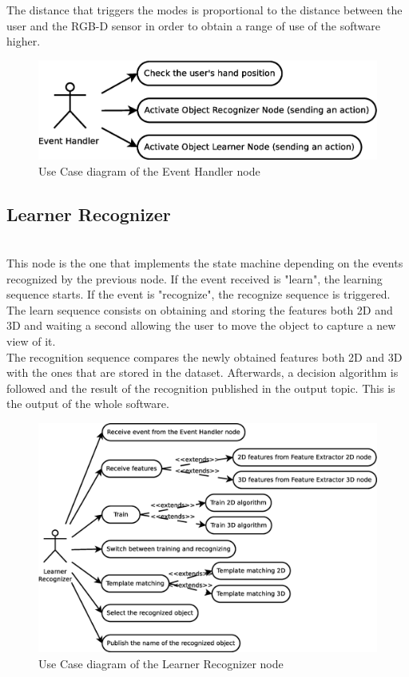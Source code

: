 	The distance that triggers the modes is proportional to the distance between the user and the RGB-D sensor in order to obtain a range of use of the software higher. 
	\begin{figure}[h]
		\begin{center}
			\includegraphics[scale=0.2]{img/diagrams/uc_event_handler.eps}
			\caption[Use case diagram Event Handler node]{Use Case diagram of the Event Handler node}
		\end{center}
	\end{figure}

\subsection{Learner Recognizer}\\

	This node is the one that implements the state machine depending on the events recognized by the previous node. If the event received is "learn", the learning sequence starts. If the event is "recognize", the recognize sequence is triggered. 
	\\

	The learn sequence consists on obtaining and storing the features both 2D and 3D and waiting a second allowing the user to move the object to capture a new view of it. 
	\\

	The recognition sequence compares the newly obtained features both 2D and 3D with the ones that are stored in the dataset. Afterwards, a decision algorithm is followed and the result of the recognition published in the output topic. This is the output of the whole software. 

	\begin{figure}[h]
		\begin{center}
			\includegraphics[scale=0.2]{img/diagrams/uc_learner_recognizer.eps}
			\caption[Use case diagram Learner Recognizer node]{Use Case diagram of the Learner Recognizer node}
		\end{center}
	\end{figure}



